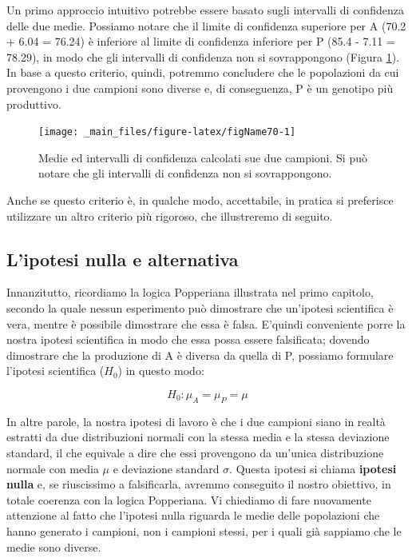 \documentclass[a4paper,12pt,oneside]{book}
\begin{document}
Un primo approccio intuitivo potrebbe essere basato sugli intervalli di confidenza delle due medie. Possiamo notare che il limite di confidenza superiore per A (70.2 + 6.04 = 76.24) è inferiore al limite di confidenza inferiore per P (85.4 - 7.11 = 78.29), in modo che gli intervalli di confidenza non si sovrappongono (Figura \ref{fig:figName70}). In base a questo criterio, quindi, potremmo concludere che le popolazioni da cui provengono i due campioni sono diverse e, di conseguenza, P è un genotipo più produttivo.

\begin{figure}

{\centering \texttt{[image: \_main\_files/figure-latex/figName70-1]} 

}

\caption{Medie ed intervalli di confidenza calcolati sue due campioni. Si può notare che gli intervalli di confidenza non si sovrappongono.}\label{fig:figName70}
\end{figure}

Anche se questo criterio è, in qualche modo, accettabile, in pratica si preferisce utilizzare un altro criterio più rigoroso, che illustreremo di seguito.

\hypertarget{lipotesi-nulla-e-alternativa}{%
\subsection{L'ipotesi nulla e alternativa}\label{lipotesi-nulla-e-alternativa}}

Innanzitutto, ricordiamo la logica Popperiana illustrata nel primo capitolo, secondo la quale nessun esperimento può dimostrare che un'ipotesi scientifica è vera, mentre è possibile dimostrare che essa è falsa. E'quindi conveniente porre la nostra ipotesi scientifica in modo che essa possa essere falsificata; dovendo dimostrare che la produzione di A è diversa da quella di P, possiamo formulare l'ipotesi scientifica (\(H_0\)) in questo modo:

\[H_0: \mu_A = \mu_P = \mu\]

In altre parole, la nostra ipotesi di lavoro è che i due campioni siano in realtà estratti da due distribuzioni normali con la stessa media e la stessa deviazione standard, il che equivale a dire che essi provengono da un'unica distribuzione normale con media \(\mu\) e deviazione standard \(\sigma\). Questa ipotesi si chiama \textbf{ipotesi nulla} e, se riuscissimo a falsificarla, avremmo conseguito il nostro obiettivo, in totale coerenza con la logica Popperiana. Vi chiediamo di fare nuovamente attenzione al fatto che l'ipotesi nulla riguarda le medie delle popolazioni che hanno generato i campioni, non i campioni stessi, per i quali già sappiamo che le medie sono diverse.
\end{document}
